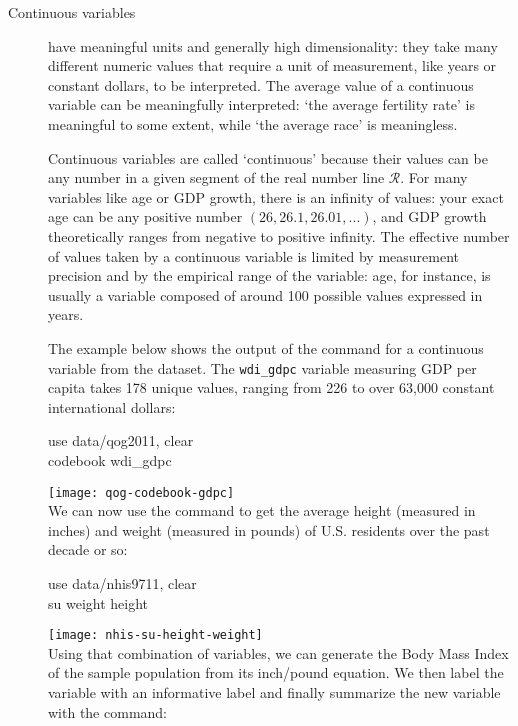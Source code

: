 \begin{description}
	\item[Continuous variables] have meaningful units and generally high dimensionality: they take many different numeric values that require a unit of measurement, like years or constant dollars, to be interpreted. The average value of a continuous variable can be meaningfully interpreted: `the average fertility rate' is meaningful to some extent, while `the average race' is meaningless.

	Continuous variables are called `continuous' because their values can be any number in a given segment of the real number line $\mathcal{R}$. For many variables like age or GDP growth, there is an infinity of values: your exact age can be any positive number $(26, 26.1, 26.01, ...)$, and GDP growth theoretically ranges from negative to positive infinity. The effective number of values taken by a continuous variable is limited by measurement precision and by the empirical range of the variable: age, for instance, is usually a variable composed of around 100 possible values expressed in years.

	The example below shows the output of the  command for a continuous variable from the \qog dataset. The \texttt{wdi\_gdpc} variable measuring GDP per capita takes 178 unique values, ranging from 226 to over 63,000 constant international dollars:\\[1em]
	
	\begin{docspec}
		use data/qog2011, clear\\
		codebook wdi\_gdpc
	\end{docspec}
	
	\texttt{[image: qog-codebook-gdpc]}\\[1em]
	
	We can now use the  command to get the average height (measured in inches) and weight (measured in pounds) of U.S. residents over the past decade or so:
	
	\begin{docspec}
		use data/nhis9711, clear\\
		su weight height
	\end{docspec}
		
	\texttt{[image: nhis-su-height-weight]}\\[1em]
	
	Using that combination of variables, we can generate the Body Mass Index of the sample population from its inch/pound equation. We then label the variable with an informative label and finally summarize the new variable with the  command:\\[1em]
	

\end{description}
